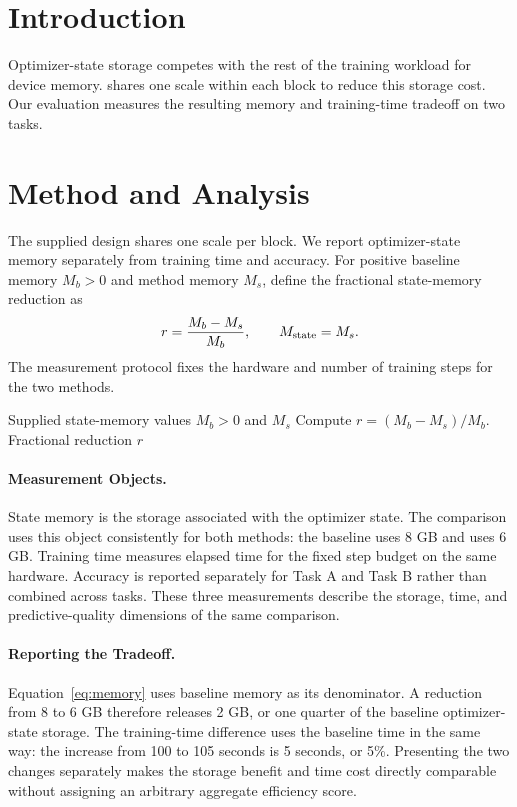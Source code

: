 \section{Introduction}\label{sec:introduction}
Optimizer-state storage competes with the rest of the training workload for device memory.
\method{} shares one scale within each block to reduce this storage cost.
Our evaluation measures the resulting memory and training-time tradeoff on two tasks.

\section{Method and Analysis}\label{sec:method}
The supplied design shares one scale per block. We report optimizer-state memory separately from training time and accuracy.
For positive baseline memory $M_b>0$ and method memory $M_s$, define the fractional state-memory reduction as
\begin{equation}\label{eq:memory}
 r=\frac{M_b-M_s}{M_b},\qquad M_{\mathrm{state}}=M_s.
\end{equation}
The measurement protocol fixes the hardware and number of training steps for the two methods.

\begin{algorithm}[h]
\caption{Computing the Reported Storage Reduction}\label{alg:summary}
\begin{algorithmic}[1]
\REQUIRE Supplied state-memory values $M_b>0$ and $M_s$
\STATE Compute $r=(M_b-M_s)/M_b$.
\ENSURE Fractional reduction $r$
\end{algorithmic}
\end{algorithm}


\paragraph{Measurement Objects.}
State memory is the storage associated with the optimizer state.
The comparison uses this object consistently for both methods: the baseline uses 8 GB and \method{} uses 6 GB.
Training time measures elapsed time for the fixed step budget on the same hardware.
Accuracy is reported separately for Task A and Task B rather than combined across tasks.
These three measurements describe the storage, time, and predictive-quality dimensions of the same comparison.

\paragraph{Reporting the Tradeoff.}
Equation~\ref{eq:memory} uses baseline memory as its denominator.
A reduction from 8 to 6 GB therefore releases 2 GB, or one quarter of the baseline optimizer-state storage.
The training-time difference uses the baseline time in the same way: the increase from 100 to 105 seconds is 5 seconds, or 5\%.
Presenting the two changes separately makes the storage benefit and time cost directly comparable without assigning an arbitrary aggregate efficiency score.

